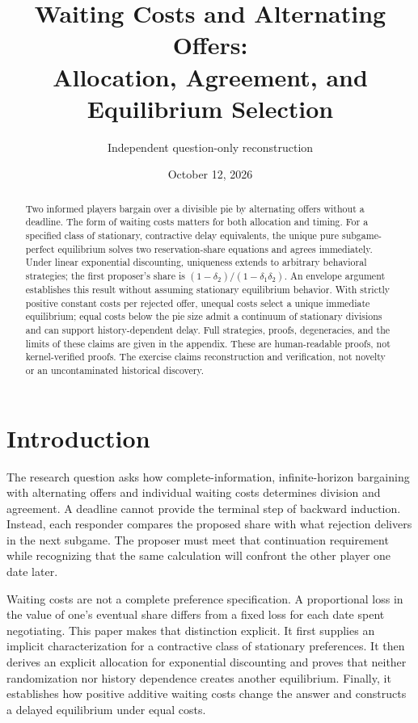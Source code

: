 \documentclass[11pt]{article}
\title{Waiting Costs and Alternating Offers:\\Allocation, Agreement, and Equilibrium Selection}
\author{Independent question-only reconstruction}
\date{October 12, 2026}
\begin{document}
\maketitle
\begin{abstract}
Two informed players bargain over a divisible pie by alternating offers without a deadline. The form of waiting costs matters for both allocation and timing. For a specified class of stationary, contractive delay equivalents, the unique pure subgame-perfect equilibrium solves two reservation-share equations and agrees immediately. Under linear exponential discounting, uniqueness extends to arbitrary behavioral strategies; the first proposer's share is $(1-\delta_2)/(1-\delta_1\delta_2)$. An envelope argument establishes this result without assuming stationary equilibrium behavior. With strictly positive constant costs per rejected offer, unequal costs select a unique immediate equilibrium; equal costs below the pie size admit a continuum of stationary divisions and can support history-dependent delay. Full strategies, proofs, degeneracies, and the limits of these claims are given in the appendix. These are human-readable proofs, not kernel-verified proofs. The exercise claims reconstruction and verification, not novelty or an uncontaminated historical discovery.
\end{abstract}

\section{Introduction}
The research question asks how complete-information, infinite-horizon bargaining with alternating offers and individual waiting costs determines division and agreement. A deadline cannot provide the terminal step of backward induction. Instead, each responder compares the proposed share with what rejection delivers in the next subgame. The proposer must meet that continuation requirement while recognizing that the same calculation will confront the other player one date later.

Waiting costs are not a complete preference specification. A proportional loss in the value of one's eventual share differs from a fixed loss for each date spent negotiating. This paper makes that distinction explicit. It first supplies an implicit characterization for a contractive class of stationary preferences. It then derives an explicit allocation for exponential discounting and proves that neither randomization nor history dependence creates another equilibrium. Finally, it establishes how positive additive waiting costs change the answer and constructs a delayed equilibrium under equal costs.
\end{document}
